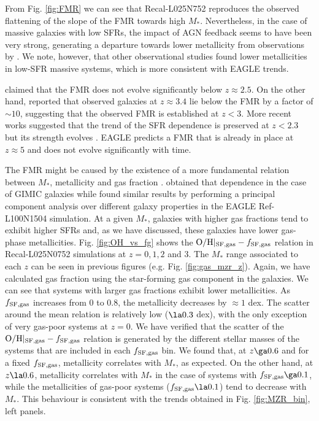 \documentclass[useAMS,usenatbib]{mn2e}
\begin{document}
From Fig. \ref{fig:FMR} we can see that Recal-L025N752 reproduces 
the observed flattening of the slope of the FMR towards high $M_*$.  Nevertheless, 
in the case of massive galaxies with low SFRs, the impact of AGN feedback seems to have been very strong,
generating a departure towards lower metallicity from observations by \citet{mannucci2009}.  
We note, however, that other observational studies 
\citep[e.g.][]{yates2011, laralopez2013b, andrews2013, zahid2013} found lower metallicities in low-SFR massive
systems, which is more consistent with {\sc EAGLE} trends.

\citet{mannucci2010} claimed that the FMR does not evolve significantly
below $z\approx 2.5$.
On the other hand, 
\citet{troncoso2014} reported that observed galaxies at $z \approx 3.4$ lie below the FMR by a factor of $\sim 10$, suggesting that the observed FMR is established at $z < 3$. 
More recent works suggested that the trend of the SFR dependence is preserved at $z < 2.3$ but
its strength evolves \citep{salim2015, brown2016, grasshorn2016}.
{\sc EAGLE} predicts a FMR that is already in place at 
$ z \approx 5$ and does not evolve significantly with time.  

The FMR might be caused by the existence of
a more fundamental relation between $M_*$, metallicity and gas fraction \citep[e.g.][]{bothwell2013, hughes2013}.
\citet{derossi2015} obtained that dependence in the case of GIMIC
galaxies while \citet{lagos2015} found similar results by performing
a principal component analysis over different galaxy properties in the {\sc EAGLE} Ref-L100N1504 simulation.
At a given $M_*$, galaxies with higher gas fractions tend to exhibit higher SFRs
and, as we have discussed, these galaxies have lower gas-phase metallicities.  
Fig. \ref{fig:OH_vs_fg} shows the 
${\rm O/H}|_{\rm SF,gas} - f_{\rm SF,gas}$ relation in Recal-L025N0752 simulations at
$z = 0,1,2$ and 3.
The $M_*$ range associated to each $z$ 
can be seen in previous figures (e.g. Fig. \ref{fig:gas_mzr_z}).
Again, we have calculated gas fraction using the star-forming gas component in the galaxies.
We can see that systems with larger gas fractions exhibit lower metallicities.
As $f_{\rm SF,gas}$ increases from 0 to 0.8, the metallicity decreases by $\approx 1$ dex. 
The scatter around the mean relation is relatively low ($\la 0.3$ dex), with the only exception of 
very gas-poor systems at $z=0$. We have verified that the scatter of the 
${\rm O/H}|_{\rm SF,gas} - f_{\rm SF,gas}$ relation is generated by the different stellar masses
of the systems that are included in each $f_{\rm SF,gas}$ bin.
We found that, at $z \ga 0.6$ and for a fixed $f_{\rm SF,gas}$,
metallicity correlates with $M_*$, as expected.  On the other hand, at $z \la 0.6$, 
metallicity correlates with $M_*$ in the case of systems with $f_{\rm SF,gas} \ga 0.1$, 
while the metallicities of gas-poor systems ($f_{\rm SF,gas} \la 0.1$) tend to decrease with $M_*$.
This behaviour is consistent with the trends obtained in 
Fig. \ref{fig:MZR_bin}, left panels.
\end{document}
